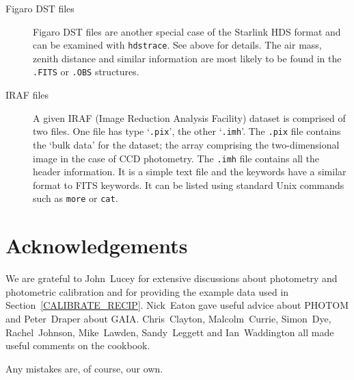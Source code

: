 \documentclass[twoside,11pt]{article}
\newcommand{\xref}[3]{#1}
\begin{document}
\begin{description}
  \item[Figaro DST files] Figaro DST files are another special case
   of the Starlink HDS format and can be examined with
   \xref{{\tt hdstrace}}{sun102}{}.  See above for details.  The air
   mass, zenith distance and similar information are most likely to be
   found in the {\tt .FITS} or {\tt .OBS} structures.

  \item[IRAF files] A given IRAF (Image Reduction Analysis Facility)
   dataset is comprised of two files.  One file has type `{\tt .pix}',
   the other `{\tt .imh}'.  The {\tt .pix} file contains the `bulk
   data' for the dataset; the array comprising the two-dimensional
   image in the case of CCD photometry.  The {\tt .imh} file contains
   all the header information.  It is a simple text file and the
   keywords have a similar format to FITS keywords.  It can be listed
   using standard Unix commands such as {\tt more} or {\tt cat}.

\end{description}


\newpage
{}
\section*{Acknowledgements}

We are grateful to John~Lucey for extensive discussions about photometry
and photometric calibration and for providing the example data used in
Section~\ref{CALIBRATE_RECIP}.  Nick~Eaton gave useful advice about
PHOTOM and Peter~Draper about GAIA.  Chris~Clayton, Malcolm~Currie,
Simon~Dye, Rachel~Johnson, Mike~Lawden, Sandy~Leggett and Ian~Waddington
all made useful comments on the cookbook.

Any mistakes are, of course, our own.



% 

\end{document}
